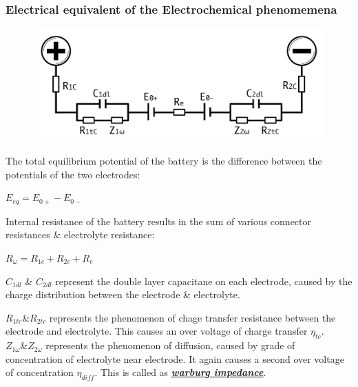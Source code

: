 \documentclass{beamer}
\begin{document}
\begin{frame}[label=electrical_equivalent]    %
  \frametitle{Electrical equivalent of the Electrochemical phenomemena}
  \fontsize{8pt}{10}\selectfont
    \vspace{-10pt}
    \begin{figure}
      \includegraphics[width=0.5\linewidth]{./Resources/Images/Electrical_Equivalent.pdf}
    \end{figure}
    \vspace{-10pt}
   
      The total equilibrium potential of the battery is the difference between the potentials of the two electrodes:
      \vspace{-8pt}
      \begin{center}
        $E_{eq} = E_{0+} - E_{0-}$
      \end{center}
      \vspace{-5pt}
      
      Internal resistance of the battery results in the sum of various connector resistances \& electrolyte resistance: \\
      \vspace{-8pt}
      \begin{center}
        $R_{\omega} = R_{1c} + R_{2c} + R_{e}$
      \end{center}
      \vspace{-5pt}
      
      $C_{1dl}$ \& $C_{2dl}$ represent the double layer capacitane on each electrode, caused by the charge distribution between the electrode \& electrolyte.
      
      \medskip
      $R_{1tc} \& R_{2tc}$ represents the phenomenon of chage transfer resistance between the electrode and electrolyte. This causes an over voltage of charge transfer $\eta_{tc}$.\\

      \medskip
      $Z_{1\omega} \& Z_{2\omega}$ represents the phenomenon of diffusion, caused by grade of concentration of electrolyte near electrode. It again causes a second over voltage of
      concentration $\eta_{diff}$. This is called as \href{https://en.wikipedia.org/wiki/Warburg_element}{\textbf{\textit{\underline{warburg impedance}}}}.
      
      \begin{center}
        \hyperlink{analysis}{}  
      \end{center}
      
\end{frame}
\end{document}
